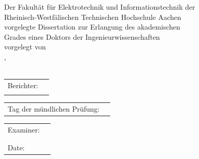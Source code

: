\begin{titlepage}
	\onehalfspacing
	\begin{center}
		\vspace*{1cm}
		\begin{LARGE}
			\textbf{\textsf{}}
		\end{LARGE}
		
		\vspace{1.5cm}
		
		Der Fakultät für Elektrotechnik und Informationstechnik der\\
		Rheinisch-Westfälischen Technischen Hochschule Aachen\\
		vorgelegte Dissertation zur Erlangung des akademischen\\
		Grades eines Doktors der Ingenieurwissenschaften\\
		\vspace{1.5cm}
		vorgelegt von\\
		\vspace{1.5cm}
		{\varName} {\varSurname}, \varDegree\\ 
		\varBirthPlace\\
	\end{center}
	\vfill
	{\begin{tabular}{p{2.5cm}l}
			Berichter: & \varExaminant\\
			& \varSecondExaminant
		\end{tabular}
		
		\vspace{0.5cm}
		
		\begin{tabular}{p{5cm}l}
			Tag der mündlichen Prüfung:& \varDate
	\end{tabular}}
	{\begin{tabular}{p{2.5cm}l}
			Examiner: & \varExaminant\\
			& \varSecondExaminant\\
			& \\
			Date:& \varDate
		\end{tabular}
		
		\vspace{0.5cm}
		
		\begin{tabular}{p{5cm}l}
	\end{tabular}}
	\vspace{1cm}
	

\end{titlepage}
